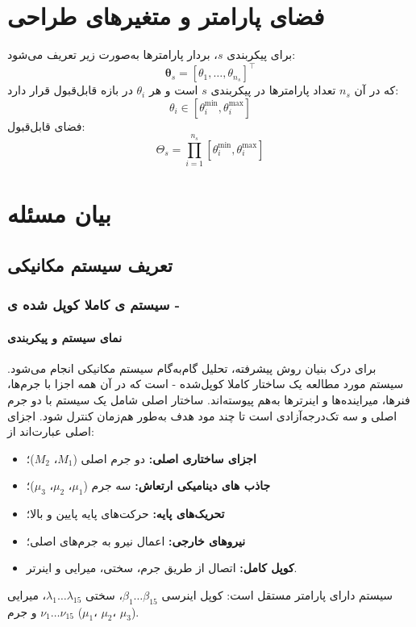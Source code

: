 \section{فضای پارامتر و متغیرهای طراحی}
برای پیکربندی $s$، بردار پارامترها به‌صورت زیر تعریف می‌شود:
\begin{equation}
\boldsymbol{\theta}_s = [\theta_1,\ldots,\theta_{n_s}]^{\top}
\label{eq:theta_s}
\end{equation}
که در آن $n_s$ تعداد پارامترها در پیکربندی $s$ است و هر $\theta_i$ در بازه قابل‌قبول قرار دارد:
\begin{equation}
\theta_i \in [ \theta_i^{\min}, \theta_i^{\max} ]
\label{eq:theta_i_range}
\end{equation}
فضای قابل‌قبول:
\begin{equation}
\Theta_s = \prod_{i=1}^{n_s} [ \theta_i^{\min}, \theta_i^{\max} ]
\label{eq:Theta_s}
\end{equation}

\section{بیان مسئله}
\subsection{تعریف سیستم مکانیکی}
\subsubsection{سیستم ی کاملا کوپل شده ی -}
\paragraph{نمای سیستم و پیکربندی}
برای درک بنیان روش  پیشرفته، تحلیل گام‌به‌گام سیستم مکانیکی انجام می‌شود. سیستم مورد مطالعه یک ساختار کاملا کوپل‌شده - است که در آن همه اجزا با جرم‌ها، فنرها، میراینده‌ها و اینرترها به‌هم پیوسته‌اند. ساختار اصلی شامل یک سیستم  با دو جرم اصلی و سه  تک‌درجه‌آزادی است تا چند مود هدف به‌طور هم‌زمان کنترل شود. اجزای اصلی عبارت‌اند از:
\begin{itemize}
    \item \textbf{اجزای ساختاری اصلی:} دو جرم اصلی ($M_1$، $M_2$)؛
    \item \textbf{جاذب های دینامیکی ارتعاش:} سه جرم  ($\mu_1$، $\mu_2$، $\mu_3$)؛
    \item \textbf{تحریک‌های پایه:} حرکت‌های پایه پایین و بالا؛
    \item \textbf{نیروهای خارجی:} اعمال نیرو به جرم‌های اصلی؛
    \item \textbf{کوپل کامل:} اتصال از طریق جرم، سختی، میرایی و اینرتر.
\end{itemize}
سیستم دارای  پارامتر مستقل است:  کوپل اینرسی $\beta_1\ldots\beta_{15}$،  سختی $\lambda_1\ldots\lambda_{15}$،  میرایی $\nu_1\ldots\nu_{15}$ و  جرم  ($\mu_1$، $\mu_2$، $\mu_3$).

